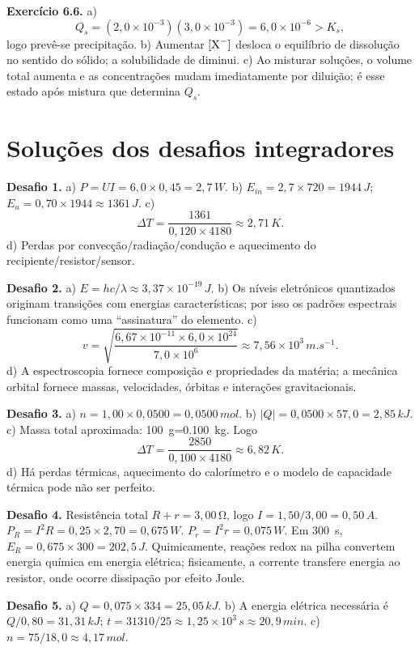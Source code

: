 \documentclass[11pt,a4paper,openany]{book}
\newcounter{desafio}
\begin{document}
\medskip
\textbf{Exercício 6.6.} a)
\[
Q_s=(2,0\times10^{-3})(3,0\times10^{-3})=6,0\times10^{-6}>K_s,
\]
logo prevê-se precipitação. b) Aumentar $[\ce{X-}]$ desloca o equilíbrio de dissolução no sentido do sólido; a solubilidade de  diminui. c) Ao misturar soluções, o volume total aumenta e as concentrações mudam imediatamente por diluição; é esse estado após mistura que determina $Q_s$.

\chapter{Soluções dos desafios integradores}

\textbf{Desafio 1.} a) $P=UI=6,0\times0,45=2,7\,\si{W}$. b) $E_{in}=2,7\times720=1944\,\si{J}$; $E_u=0,70\times1944\approx1361\,\si{J}$. c)
\[
\Delta T=\frac{1361}{0,120\times4180}\approx2,71\,\si{K}.
\]
d) Perdas por convecção/radiação/condução e aquecimento do recipiente/resistor/sensor.

\medskip
\textbf{Desafio 2.} a) $E=hc/\lambda\approx3,37\times10^{-19}\,\si{J}$. b) Os níveis eletrónicos quantizados originam transições com energias características; por isso os padrões espectrais funcionam como uma “assinatura” do elemento. c)
\[
v=\sqrt{\frac{6,67\times10^{-11}\times6,0\times10^{24}}{7,0\times10^6}}
\approx7,56\times10^3\,\si{m.s^{-1}}.
\]
d) A espectroscopia fornece composição e propriedades da matéria; a mecânica orbital fornece massas, velocidades, órbitas e interações gravitacionais.

\medskip
\textbf{Desafio 3.} a) $n=1,00\times0,0500=0,0500\,\si{mol}$. b) $|Q|=0,0500\times57,0=2,85\,\si{kJ}$. c) Massa total aproximada: \SI{100}{g}=\SI{0.100}{kg}. Logo
\[
\Delta T=\frac{2850}{0,100\times4180}\approx6,82\,\si{K}.
\]
d) Há perdas térmicas, aquecimento do calorímetro e o modelo de capacidade térmica pode não ser perfeito.

\medskip
\textbf{Desafio 4.} Resistência total $R+r=3,00\,\si{\ohm}$, logo $I=1,50/3,00=0,50\,\si{A}$. $P_R=I^2R=0,25\times2,70=0,675\,\si{W}$. $P_r=I^2r=0,075\,\si{W}$. Em \SI{300}{s}, $E_R=0,675\times300=202,5\,\si{J}$. Quimicamente, reações redox na pilha convertem energia química em energia elétrica; fisicamente, a corrente transfere energia ao resistor, onde ocorre dissipação por efeito Joule.

\medskip
\textbf{Desafio 5.} a) $Q=0,075\times334=25,05\,\si{kJ}$. b) A energia elétrica necessária é $Q/0,80=31,31\,\si{kJ}$; $t=31310/25\approx1,25\times10^3\,\si{s}\approx20,9\,\si{min}$. c) $n=75/18,0\approx4,17\,\si{mol}$.
\end{document}
